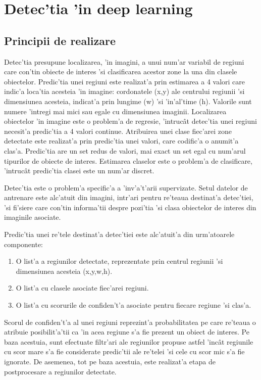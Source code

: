 \documentclass[12pt,a4paper,twoside]{report}
\begin{document}
\section{Detec'tia 'in deep learning}
\subsection{Principii de realizare}
Detec'tia presupune localizarea, 'in imagini, a unui num'ar variabil de regiuni care con'tin obiecte de interes 'si clasificarea acestor zone la una din clasele obiectelor. Predic'tia unei regiuni este realizat'a prin estimarea a 4 valori care indic'a loca'tia acesteia 'in imagine: cordonatele (x,y) ale centrului regiunii 'si dimensiunea acesteia, indicat'a prin lungime (w) 'si 'in'al'time (h). Valorile sunt numere 'intregi mai mici sau egale cu dimensiunea imaginii. Localizarea obiectelor 'in imagine este o problem'a de regresie, 'intruc\^at detec'tia unei regiuni necesit'a predic'tia a 4 valori continue. Atribuirea unei clase fiec'arei zone detectate este realizat'a prin predic'tia unei valori, care codific'a o anumit'a clas'a. Predic'tia are un set redus de valori, mai exact un set egal cu num'arul tipurilor de obiecte de interes. Estimarea claselor este o problem'a de clasificare, 'intruc\^at predic'tia clasei este un num'ar discret.

Detec'tia este o problem'a specific'a a 'inv'a't'arii supervizate. Setul datelor de antrenare este alc'atuit din imagini, intr'ari pentru re'teaua destinat'a detec'tiei, 'si fi'siere care con'tin informa'tii despre pozi'tia 'si clasa obiectelor de interes din imaginile asociate.

Predic'tia unei re'tele destinat'a detec'tiei este alc'atuit'a din urm'atoarele componente:
\begin{enumerate}
\item O list'a a regiunilor detectate, reprezentate prin centrul regiunii 'si dimensiunea acesteia (x,y,w,h).
\item O list'a cu clasele asociate fiec'arei regiuni.
\item O list'a cu scorurile de confiden't'a asociate pentru fiecare regiune 'si clas'a.
\end{enumerate}

Scorul de confiden't'a al unei regiuni reprezint'a probabilitatea pe care re'teaua o atribuie posibilit'a'tii ca 'in acea regiune s'a fie prezent un obiect de interes. Pe baza acestuia, sunt efectuate filtr'ari ale regiunilor propuse astfel 'inc\^at regiunile cu scor mare s'a fie considerate predic'tii ale re'telei 'si cele cu scor mic s'a fie ignorate. De asemenea, tot pe baza acestuia, este realizat'a etapa de postprocesare a regiunilor detectate. 
\end{document}
